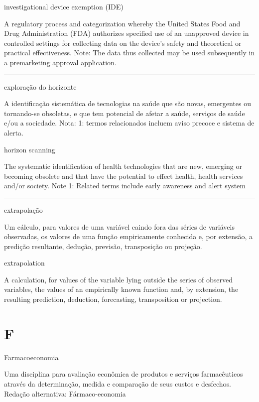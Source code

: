 \documentclass[
  openany]{book}
\begin{document}
investigational device exemption (IDE)

A regulatory process and categorization whereby the United States Food and Drug Administration (FDA) authorizes specified use of an unapproved device in controlled settings for collecting data on the device's safety and theoretical or practical effectiveness. Note: The data thus collected may be used subsequently in a premarketing approval application.

\begin{center}\rule{0.5\linewidth}{0.5pt}\end{center}

exploração do horizonte

A identificação sistemática de tecnologias na saúde que são novas, emergentes ou tornando-se obsoletas, e que tem potencial de afetar a saúde, serviços de saúde e/ou a sociedade. Nota: 1: termos relacionados incluem aviso precoce e sistema de alerta.

horizon scanning

The systematic identification of health technologies that are new, emerging or becoming obsolete and that have the potential to effect health, health services and/or society. Note 1: Related terms include early awareness and alert system

\begin{center}\rule{0.5\linewidth}{0.5pt}\end{center}

extrapolação

Um cálculo, para valores de uma variável caindo fora das séries de variáveis observadas, os valores de uma função empiricamente conhecida e, por extensão, a predição resultante, dedução, previsão, transposição ou projeção.

extrapolation

A calculation, for values of the variable lying outside the series of observed variables, the values of an empirically known function and, by extension, the resulting prediction, deduction, forecasting, transposition or projection.

\hypertarget{f}{%
\chapter*{F}\label{f}}

Farmacoeconomia

Uma disciplina para avaliação econômica de produtos e serviços farmacêuticos através da determinação, medida e comparação de seus custos e desfechos. Redação alternativa: Fármaco-economia
\end{document}

